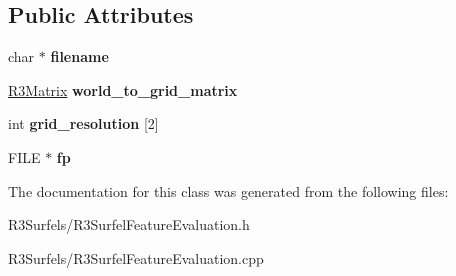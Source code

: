 \subsection*{Public Attributes}
\begin{DoxyCompactItemize}
\item 
char $\ast$ {\bfseries filename}\hypertarget{class_r3_surfel_overhead_grid_feature_a35103b79fd5100f7d6fad76945478122}{}\label{class_r3_surfel_overhead_grid_feature_a35103b79fd5100f7d6fad76945478122}

\item 
\hyperlink{class_r3_matrix}{R3\+Matrix} {\bfseries world\+\_\+to\+\_\+grid\+\_\+matrix}\hypertarget{class_r3_surfel_overhead_grid_feature_a83f8c5c1ee35e1c901dc0d5192e1699c}{}\label{class_r3_surfel_overhead_grid_feature_a83f8c5c1ee35e1c901dc0d5192e1699c}

\item 
int {\bfseries grid\+\_\+resolution} \mbox{[}2\mbox{]}\hypertarget{class_r3_surfel_overhead_grid_feature_ad50d240e8df44c6f2f3ee408da13283b}{}\label{class_r3_surfel_overhead_grid_feature_ad50d240e8df44c6f2f3ee408da13283b}

\item 
F\+I\+LE $\ast$ {\bfseries fp}\hypertarget{class_r3_surfel_overhead_grid_feature_aa605748497da4cc24104413d525da335}{}\label{class_r3_surfel_overhead_grid_feature_aa605748497da4cc24104413d525da335}

\end{DoxyCompactItemize}


The documentation for this class was generated from the following files\+:\begin{DoxyCompactItemize}
\item 
R3\+Surfels/R3\+Surfel\+Feature\+Evaluation.\+h\item 
R3\+Surfels/R3\+Surfel\+Feature\+Evaluation.\+cpp\end{DoxyCompactItemize}
